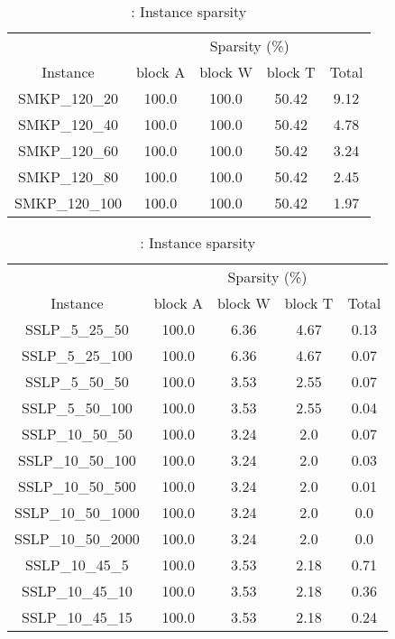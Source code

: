 \begin{table}[H]
\centering
\caption{\smkp: Instance sparsity} 
\label{table:instance_sparsity_info_smkp} 
\begin{tabular}{|c|cccc|}
\hline 
& \multicolumn{4}{c|}{Sparsity (\%)}  \\ \cline{2-5}
Instance      & block A & block W & block T & Total \\ \hline
SMKP\_120\_20 & 100.0 & 100.0 & 50.42 & 9.12 \\ 
SMKP\_120\_40 & 100.0 & 100.0 & 50.42 & 4.78 \\ 
SMKP\_120\_60 & 100.0 & 100.0 & 50.42 & 3.24 \\ 
SMKP\_120\_80 & 100.0 & 100.0 & 50.42 & 2.45 \\ 
SMKP\_120\_100 & 100.0 & 100.0 & 50.42 & 1.97 \\ 
\hline 
\end{tabular} 
\end{table} 
  

\begin{table}[H]
\centering
\caption{\sslp: Instance sparsity} 
\label{table:instance_sparsity_info_sslp} 
\begin{tabular}{|c|cccc|}
\hline 
& \multicolumn{4}{c|}{Sparsity (\%)}  \\ \cline{2-5}
Instance      & block A & block W & block T & Total \\ \hline
SSLP\_5\_25\_50 & 100.0 & 6.36 & 4.67 & 0.13 \\ 
SSLP\_5\_25\_100 & 100.0 & 6.36 & 4.67 & 0.07 \\ 
SSLP\_5\_50\_50 & 100.0 & 3.53 & 2.55 & 0.07 \\ 
SSLP\_5\_50\_100 & 100.0 & 3.53 & 2.55 & 0.04 \\ 
SSLP\_10\_50\_50 & 100.0 & 3.24 & 2.0 & 0.07 \\ 
SSLP\_10\_50\_100 & 100.0 & 3.24 & 2.0 & 0.03 \\ 
SSLP\_10\_50\_500 & 100.0 & 3.24 & 2.0 & 0.01 \\ 
SSLP\_10\_50\_1000 & 100.0 & 3.24 & 2.0 & 0.0 \\ 
SSLP\_10\_50\_2000 & 100.0 & 3.24 & 2.0 & 0.0 \\ 
SSLP\_10\_45\_5 & 100.0 & 3.53 & 2.18 & 0.71 \\ 
SSLP\_10\_45\_10 & 100.0 & 3.53 & 2.18 & 0.36 \\ 
SSLP\_10\_45\_15 & 100.0 & 3.53 & 2.18 & 0.24 \\ 
\hline 
\end{tabular} 
\end{table} 
  

